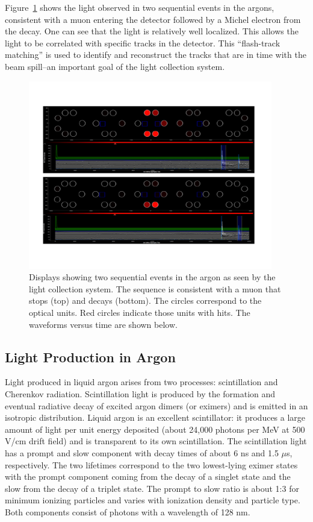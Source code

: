 Figure~\ref{fig:muondecaylight} shows the light observed in two sequential events in the argons, consistent with a muon entering the detector followed by a Michel electron from the decay.   One can see that the light is relatively well localized.   This allows the light to be correlated with specific tracks in the detector.  This ``flash-track matching'' is used to identify and reconstruct the tracks that are in time with the beam spill--an important goal of the light collection system.

\begin{figure}
	\centering
    \includegraphics[width=0.95\textwidth]{./figures/muondecay.pdf} 
    \caption{Displays showing two sequential events in the argon as seen by the light collection system.  The sequence is consistent with a muon that stops (top) and decays (bottom).  The circles correspond to the optical units. Red circles indicate those units with hits.    The waveforms versus time are shown below.}\label{fig:muondecaylight}
\end{figure}


\subsection{Light Production in Argon \label{sint}}

Light produced in liquid argon arises from two processes: scintillation and Cherenkov radiation.  
Scintillation light is produced by the formation and eventual radiative decay of excited argon dimers (or eximers) and is emitted in an isotropic distribution.  Liquid argon is an excellent scintillator: it produces a large amount of light per unit energy deposited (about 24,000 photons per MeV at 500 V/cm drift field) and is transparent to its own scintillation. %
The scintillation light has a prompt and slow component with decay times of about 6 ns and 1.5 $\mu$s, respectively. The two lifetimes correspond to the two lowest-lying eximer states with the prompt component coming from the decay of a singlet state and the slow from the decay of a triplet state.  The prompt to slow ratio is about 1:3 for minimum ionizing particles and varies with ionization density and particle type. Both components consist of photons with a wavelength of 128 nm.

